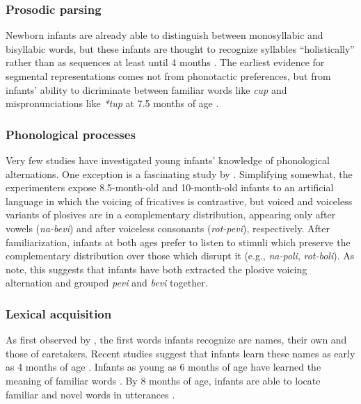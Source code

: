 \subsubsection{Prosodic parsing}

Newborn infants are already able to distinguish between monosyllabic and bisyllabic words, but these infants are thought to recognize syllables ``holistically'' rather than as sequences at least until 4 months \citep[e.g.,]{Bertoncini1981,Eimas1999,Jusczyk1987}. The earliest evidence for segmental representations comes not from phonotactic preferences, but from infants' ability to dicriminate between familiar words like \emph{cup} and mispronunciations like \emph{*tup} at 7.5 months of age \citep{Jusczyk1995}.

\subsubsection{Phonological processes}

Very few studies have investigated young infants' knowledge of phonological alternations. One exception is a fascinating study by \citet{White2008}. Simplifying somewhat, the experimenters expose 8.5-month-old and 10-month-old infants to an artificial language in which the voicing of fricatives is contrastive, but voiced and voiceless variants of plosives are in a complementary distribution, appearing only after vowels (\emph{na-bevi}) and after voiceless consonants (\emph{rot-pevi}), respectively. After familiarization, infants at both ages prefer to listen to stimuli which preserve the complementary distribution over those which disrupt it (e.g., \emph{na-poli}, \emph{rot-boli}). As \citeauthor{White2008} note, this suggests that infants have both extracted the plosive voicing alternation and grouped \emph{pevi} and \emph{bevi} together.

\subsubsection{Lexical acquisition}

As first observed by \citet{Darwin1877}, the first words infants recognize are names, their own and those of caretakers. Recent studies suggest that infants learn these names as early as 4 months of age \citep{Bortfeld2005,Mandel1995,Tincoff1999}. Infants as young as 6 months of age have learned the meaning of familiar words \citep{Bergelson2012}. By 8 months of age, infants are able to locate familiar and novel words in utterances \citep{Jusczyk1997,Seidl2006}.

